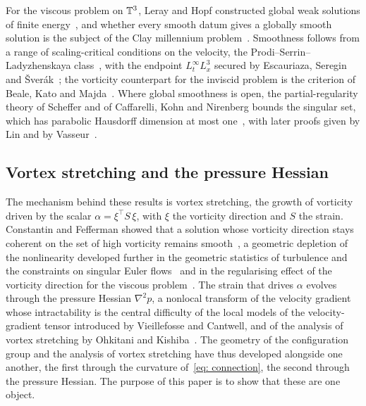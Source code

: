 For the viscous problem on $\mathbb{T}^3$, Leray and Hopf constructed global weak
solutions of finite energy~\cite{leray-1934-sur-le-mou, hopf-1951-ube-die-anf},
and whether every smooth datum gives a globally smooth solution is the subject of
the Clay millennium problem~\cite{fefferman-2006-exi-smo}. Smoothness follows
from a range of scaling-critical conditions on the velocity, the
Prodi--Serrin--Ladyzhenskaya class~\cite{prodi-1959-un-teo-di,
serrin-1962-int-reg-wea, ladyzhenskaya-1967-uni-smo-gen}, with the endpoint
$L^\infty_t L^3_x$ secured by Escauriaza, Seregin and
\v{S}ver\'ak~\cite{escauriaza-2003-l3i-nav-equ}; the vorticity counterpart for
the inviscid problem is the criterion of Beale, Kato and
Majda~\cite{beale-1984-rem-bre-smo}. Where global smoothness is open, the
partial-regularity theory of Scheffer and of Caffarelli, Kohn and Nirenberg
bounds the singular set, which has parabolic Hausdorff dimension at most
one~\cite{scheffer-1976-par-reg-sol, caffarelli-1982-par-reg-sui}, with later
proofs given by Lin and by Vasseur~\cite{lin-1998-new-pro-caf,
vasseur-2007-new-pro-par}.

\subsection{Vortex stretching and the pressure Hessian}

The mechanism behind these results is vortex stretching, the growth of vorticity
driven by the scalar $\alpha = \xi^{\top} S\,\xi$, with $\xi$ the vorticity
direction and $S$ the strain. Constantin and Fefferman showed that a solution
whose vorticity direction stays coherent on the set of high vorticity remains
smooth~\cite{constantin-1993-dir-vor-pro}, a geometric depletion of the
nonlinearity developed further in the geometric statistics of turbulence and the
constraints on singular Euler flows~\cite{constantin-1994-geo-sta-tur,
constantin-1996-geo-con-pot} and in the regularising effect of the vorticity
direction for the viscous problem~\cite{beiraodaveiga-2002-reg-eff-vor}. The
strain that drives $\alpha$ evolves through the pressure Hessian $\nabla^2 p$, a
nonlocal transform of the velocity gradient whose intractability is the central
difficulty of the local models of the velocity-gradient tensor introduced by
Vieillefosse and Cantwell, and of the analysis of vortex stretching by Ohkitani
and Kishiba~\cite{vieillefosse-1982-loc-int, cantwell-1992-exa-sol,
ohkitani-1995-non-nat}. The geometry of the configuration group and the analysis
of vortex stretching have thus developed alongside one another, the first through
the curvature of~\eqref{eq: connection}, the second through the pressure Hessian.
The purpose of this paper is to show that these are one object.

